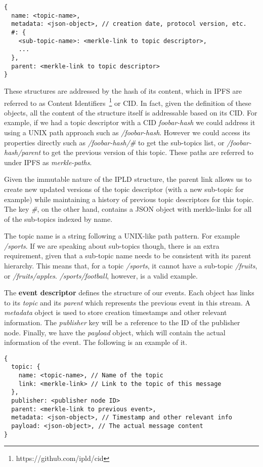 \begin{verbatim}
{
  name: <topic-name>,
  metadata: <json-object>, // creation date, protocol version, etc.
  #: {
    <sub-topic-name>: <merkle-link to topic descriptor>,
    ...
  },
  parent: <merkle-link to topic descriptor>
}
\end{verbatim}

These structures are addressed by the hash of its content, which in IPFS
are referred to as Content Identifiers~\footnote{https://github.com/ipld/cid} or CID. In
fact, given the definition of these objects, all the content of the
structure itself is addressable based on its CID. For example, if we had
a topic descriptor with a CID
\emph{foobar-hash} we could
address it using a UNIX path approach such as
\emph{/foobar-hash}. However we
could access its properties directly such as
\emph{/foobar-hash/\#} to get the
sub-topics list, or
\emph{/foobar-hash/parent} to get
the previous version of this topic. These paths are referred to under
IPFS as \emph{merkle-paths}.

Given the immutable nature of the IPLD structure, the parent link allows
us to create new updated versions of the topic descriptor (with a new
sub-topic for example) while maintaining a history of previous topic
descriptors for this topic. The key \emph{\#}, on the other hand,
contains a JSON object with merkle-links for all of the sub-topics indexed
by name.

The topic name is a string following a UNIX-like path pattern. For
example \emph{/sports}. If we are speaking about sub-topics though,
there is an extra requirement, given that a sub-topic name needs to be
consistent with its parent hierarchy. This means that, for a topic
\emph{/sports}, it cannot have a sub-topic \emph{/fruits}, or
\emph{/fruits/apples}. \emph{/sports/football}, however, is a valid
example.

The \textbf{event descriptor} defines the structure of our events. Each
object has links to its \emph{topic} and its \emph{parent} which
represents the previous event in this stream. A \emph{metadata} object
is used to store creation timestamps and other relevant information. The
\emph{publisher} key will be a reference to the ID of the publisher
node. Finally, we have the \emph{payload} object, which will contain the
actual information of the event. The following is an example of it.

\begin{verbatim}
{
  topic: {
    name: <topic-name>, // Name of the topic
    link: <merkle-link> // Link to the topic of this message
  },
  publisher: <publisher node ID>
  parent: <merkle-link to previous event>,
  metadata: <json-object>, // Timestamp and other relevant info
  payload: <json-object>, // The actual message content
}
\end{verbatim}


